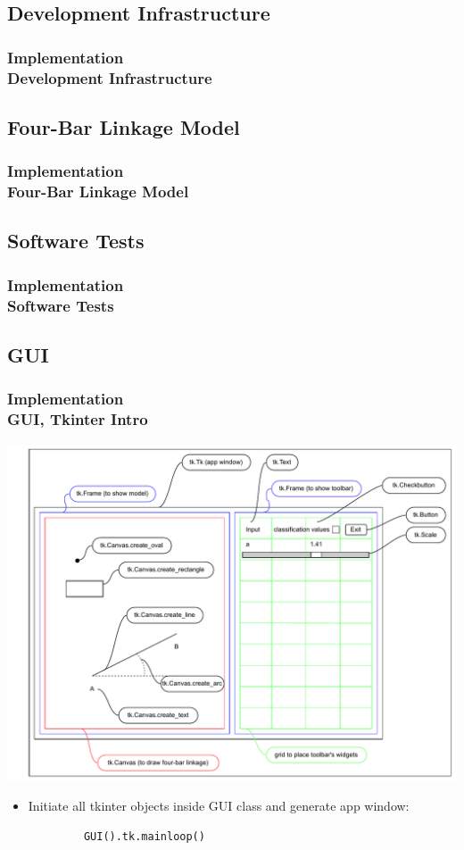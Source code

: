 \documentclass[ucs,10pt]{beamer}
\begin{document}
\subsection{Development Infrastructure}

\begin{frame}
\frametitle{Implementation \\
	\small \color{rwth-blue} Development Infrastructure}
\end{frame}

\subsection{Four-Bar Linkage Model}

\begin{frame}
\frametitle{Implementation \\
	\small \color{rwth-blue} Four-Bar Linkage Model}
\end{frame}

\subsection{Software Tests}

\begin{frame}
	\frametitle{Implementation \\
		\small \color{rwth-blue} Software Tests}
\end{frame}

\subsection{GUI}

\begin{frame}[fragile]
\frametitle{Implementation \\
	\small \color{rwth-blue} GUI, Tkinter Intro}
	\begin{center}
		\vspace*{-1mm}
		\includegraphics[width=0.78\linewidth]{./Figures/Implementation/GUI/tkinter_grid.pdf}
		\begin{itemize}
			\item Initiate all tkinter objects inside GUI class and generate app window:
		\end{itemize}
		\begin{lstlisting}
			GUI().tk.mainloop()
		\end{lstlisting}
	\end{center}
\end{frame}
\end{document}
